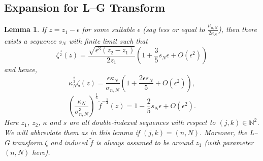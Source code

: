 \documentclass[11pt]{article}
\newtheorem{lemma}[theorem]{Lemma}
\numberwithin{equation}{section}%
\numberwithin{theorem}{section}
\begin{document}
\subsection{Expansion for L--G Transform}\label{P4seq}
\begin{lemma}\label{seq}
    If $z=z_1-\epsilon$ for some suitable $\epsilon$ (say less or equal to $\frac{\mu_{n,N}}{2\kappa_{N}}$), then there exists a sequence $s_N$ with finite limit such that
    \begin{equation}\label{a4zeta}
    \zeta^{\frac{3}{2}}(z)=\frac{\sqrt{\epsilon^3(z_{2}-z_{1})}}{2z_{1}}\left(1+\frac{3}{5}s_{N}\epsilon+O(\epsilon^2)\right)
\end{equation}
and hence,
\begin{equation}\label{a4zeta2}
   \kappa_{N}^{\frac{2}{3}}\zeta(z)=\frac{\epsilon\kappa_{N}}{\sigma_{n,N}}\left(1+\frac{2\epsilon s_{N}}{5}+O(\epsilon^2)\right),
\end{equation}
\begin{equation}\label{a4inverse}
    \left(\frac{\kappa_{N}}{\sigma^3_{n,N}}\right)^{\frac{1}{6}}\tilde{f}^{-\frac{1}{4}}(z)=1-\frac{2}{5} s_{N}\epsilon+O(\epsilon^2).
\end{equation}
Here $z_1$, $z_2$, $\kappa$ and $s$ are all double-indexed sequences with respect to $(j,k)\in\mathbb{N}^2$. We will abbreviate them as in this lemma if $(j,k)=(n,N)$. Moreover, the L--G transform $\zeta$ and induced $\tilde{f}$ is always assumed to be around $z_1$ (with parameter $(n,N)$ here).
\end{lemma}
\end{document}
